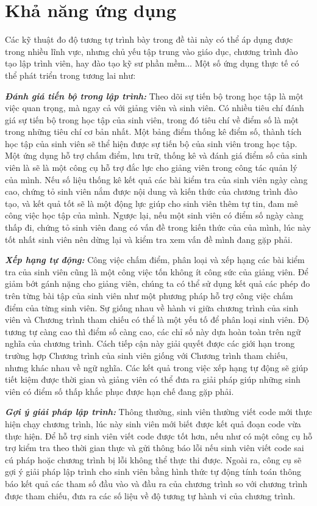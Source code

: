 \section{Khả năng ứng dụng}

Các kỹ thuật đo độ tương tự trình bày trong đề tài này có thể áp dụng
được trong nhiều lĩnh vực, nhưng chủ yếu tập trung vào giáo dục, chương trình đào tạo lập trình viên, hay đào tạo kỹ sư phần mềm... Một
số ứng dụng thực tế có thể phát triển trong tương lai như:

\textbf{\textit{Đánh giá tiến bộ trong lập trình:}} Theo dõi sự tiến
bộ trong học tập là một việc quan trọng, mà ngay cả với giảng viên và
sinh viên. Có nhiều tiêu chí đánh giá sự tiến bộ trong học tập của
sinh viên, trong đó tiêu chí về điểm số là một trong những tiêu chí cơ
bản nhất. Một bảng điểm thống kê điểm số, thành tích học tập của sinh
viên sẽ thể hiện được sự tiến bộ của sinh viên trong học tập. Một ứng
dụng hỗ trợ chấm điểm, lưu trữ, thống kê và đánh giá điểm số của sinh
viên là sẽ là một công cụ hỗ trợ đắc lực cho giảng viên trong công tác
quản lý của mình. Nếu số liệu thống kê kết quả các bài kiểm tra của
sinh viên ngày càng cao, chứng tỏ sinh viên nắm được nội dung và kiến
thức của chương trình đào tạo, và kết quả tốt sẽ là một động lực giúp
cho sinh viên thêm tự tin, đam mê công việc học tập của mình. Ngược
lại, nếu một sinh viên có điểm số ngày càng thấp đi, chứng tỏ sinh
viên đang có vấn đề trong kiến thức của của mình, lúc này tốt nhất
sinh viên nên dừng lại và kiểm tra xem vấn đề mình đang gặp phải.

\textit{\textbf{Xếp hạng tự động:}} Công việc chấm điểm, phân loại và
xếp hạng các bài kiểm tra của sinh viên cũng là một công việc tốn
không ít công sức của giảng viên. Để giảm bớt gánh nặng cho giảng
viên, chúng ta có thể sử dụng kết quả các phép đo trên từng bài tập
của sinh viên như một phương pháp hỗ trợ công việc chấm điểm của từng
sinh viên. Sự giống nhau về hành vi giữa chương trình của sinh viên và
Chương trình tham chiếu có thể là một yếu tố để phân loại sinh
viên. Độ tương tự càng cao thì điểm số càng cao, các chỉ số này dựa
hoàn toàn trên ngữ nghĩa của chương trình. Cách tiếp cận này giải
quyết được các giới hạn trong trường hợp Chương trình của sinh viên
giống với Chương trình tham chiếu, nhưng khác nhau về ngữ nghĩa. Các
kết quả trong việc xếp hạng tự động sẽ giúp tiết kiệm được thời gian
và giảng viên có thể đưa ra giải pháp giúp những sinh viên có điểm số
thấp khắc phục được hạn chế đang gặp phải.

\textit{\textbf{Gợi ý giải pháp lập trình:}} Thông thường, sinh viên
thường viết code mới thực hiện chạy chương trình, lúc này sinh viên
mới biết được kết quả đoạn code vừa thực hiện. Để hỗ trợ sinh viên
viết code được tốt hơn, nếu như có một công cụ hỗ trợ kiểm tra theo
thời gian thực và gửi thông báo lỗi nếu sinh viên viết code sai cú
pháp hoặc chương trình bị lỗi không thể thực thi được. Ngoài ra, công
cụ sẽ gợi ý giải pháp lập trình cho sinh viên bằng hình thức tự động
tính toán thông báo kết quả các tham số đầu vào và đầu ra của chương
trình so với chương trình được tham chiếu, đưa ra các số liệu về độ
tương tự hành vi của chương trình.

